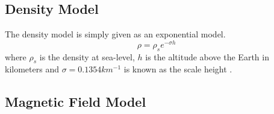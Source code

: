 \documentclass{article}
\begin{document}
\subsection{Density Model}

The density model is simply given as an exponential model. 
\begin{equation}
     \rho = \rho_s e^{-\sigma h}
\end{equation}
where $\rho_s$ is the density at sea-level, $h$ is the altitude above
the Earth in kilometers and $\sigma = 0.1354 km^{-1}$ is known as the
scale height \cite{Jacchia1,Jacchia2,Jacchia3}.  

\subsection{Magnetic Field Model}\label{s:magnetic_field}
\end{document}
